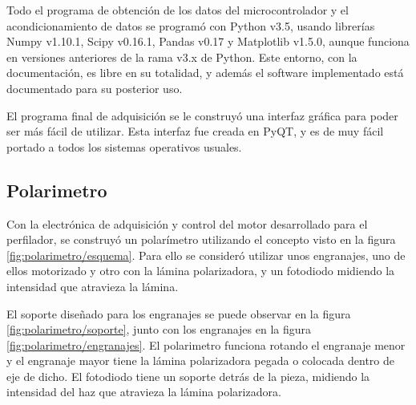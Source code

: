 Todo el programa de obtención de los datos del microcontrolador y el acondicionamiento de datos se programó con Python v3.5, usando librerías Numpy v1.10.1, Scipy v0.16.1, Pandas v0.17 y Matplotlib v1.5.0, aunque funciona en versiones anteriores de la rama v3.x de Python. Este entorno, con la documentación, es libre en su totalidad, y además el software implementado está documentado para su posterior uso. 

El programa final de adquisición se le construyó una interfaz gráfica para poder ser más fácil de utilizar. Esta interfaz fue creada en PyQT, y es de muy fácil portado a todos los sistemas operativos usuales.

\subsection{Polarimetro}

Con la electrónica de adquisición y control del motor desarrollado para el perfilador, se construyó un polarímetro utilizando el concepto visto en la figura \ref{fig:polarimetro/esquema}. Para ello se consideró utilizar unos engranajes, uno de ellos motorizado y otro con la lámina polarizadora, y un fotodiodo midiendo la intensidad que atravieza la lámina.

El soporte diseñado para los engranajes se puede observar en la figura \ref{fig:polarimetro/soporte}, junto con los engranajes en la figura \ref{fig:polarimetro/engranajes}. El polarimetro funciona rotando el engranaje menor y el engranaje mayor tiene la lámina polarizadora pegada o colocada dentro de eje de dicho. El fotodiodo tiene un soporte detrás de la pieza, midiendo la intensidad del haz que atravieza la lámina polarizadora.

